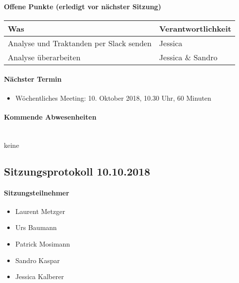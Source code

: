 \paragraph{Offene Punkte (erledigt vor nächster Sitzung)} \mbox{}
\begin{table}[H]
	\centering
	\begin{tabularx}{\textwidth}{X | p{4.5cm}}
		\rowcolor{gray!50}
		\textbf{Was} & \textbf{Verantwortlichkeit} \\
		\hline	
		Analyse und Traktanden per Slack senden & Jessica \\
		Analyse überarbeiten & Jessica \& Sandro  \\
	\end{tabularx}
	\label{tab:my-label}
\end{table}

\paragraph{Nächster Termin}
\begin{itemize}	
	\item Wöchentliches Meeting: 10. Oktober 2018, 10.30 Uhr, 60 Minuten
\end{itemize}

\paragraph{Kommende Abwesenheiten} \mbox{}\\
keine

\newpage





\subsection{Sitzungsprotokoll 10.10.2018}

\paragraph{Sitzungsteilnehmer}
\begin{itemize}	
	\item Laurent Metzger 
	\item Urs Baumann
	\item Patrick Mosimann
	\item Sandro Kaspar
	\item Jessica Kalberer
\end{itemize}

